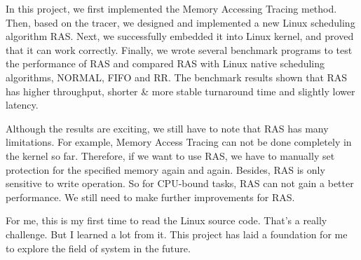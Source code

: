
\begin{summary}
In this project, we first implemented the Memory Accessing Tracing method. Then, based on the tracer, we designed and implemented a new Linux scheduling algorithm RAS. Next, we successfully embedded it into Linux kernel, and proved that it can work correctly. Finally, we wrote several benchmark programs to test the performance of RAS and compared RAS with Linux native scheduling algorithms, NORMAL, FIFO and RR. The benchmark results shown that RAS has higher throughput, shorter \& more stable turnaround time and slightly lower latency.

Although the results are exciting, we still have to note that RAS has many limitations. For example, Memory Access Tracing can not be done completely in the kernel so far. Therefore, if we want to use RAS, we have to manually set protection for the specified memory again and again. Besides, RAS is only sensitive to write operation. So for CPU-bound tasks, RAS can not gain a better performance. We still need to make further improvements for RAS.

For me, this is my first time to read the Linux source code. That's a really challenge. But I learned a lot from it. This project has laid a foundation for me to explore the field of system in the future.
\end{summary}
